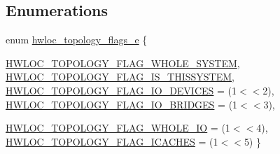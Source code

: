 \subsection*{Enumerations}
\begin{DoxyCompactItemize}
\item 
enum \hyperlink{a00044_gada025d3ec20b4b420f8038d23d6e7bde}{hwloc\_\-topology\_\-flags\_\-e} \{ \par
\hyperlink{a00044_ggada025d3ec20b4b420f8038d23d6e7bdea129b4fea1300be22bbaf0bb0958994c8}{HWLOC\_\-TOPOLOGY\_\-FLAG\_\-WHOLE\_\-SYSTEM}, 
\hyperlink{a00044_ggada025d3ec20b4b420f8038d23d6e7bdea6ecb6abc6a0bb75e81564f8bca85783b}{HWLOC\_\-TOPOLOGY\_\-FLAG\_\-IS\_\-THISSYSTEM}, 
\hyperlink{a00044_ggada025d3ec20b4b420f8038d23d6e7bdea46ae25e8896278840b1800ae9ce4de41}{HWLOC\_\-TOPOLOGY\_\-FLAG\_\-IO\_\-DEVICES} =  (1$<$$<$2), 
\hyperlink{a00044_ggada025d3ec20b4b420f8038d23d6e7bdea426b18c349f15d7046bb391d96fa947c}{HWLOC\_\-TOPOLOGY\_\-FLAG\_\-IO\_\-BRIDGES} =  (1$<$$<$3), 
\par
\hyperlink{a00044_ggada025d3ec20b4b420f8038d23d6e7bdea4a41dc181649ef81c2dcd44a54e271b9}{HWLOC\_\-TOPOLOGY\_\-FLAG\_\-WHOLE\_\-IO} =  (1$<$$<$4), 
\hyperlink{a00044_ggada025d3ec20b4b420f8038d23d6e7bdeaae509a0bed4a7067e0116c75c661178d}{HWLOC\_\-TOPOLOGY\_\-FLAG\_\-ICACHES} =  (1$<$$<$5)
 \}
\end{DoxyCompactItemize}
